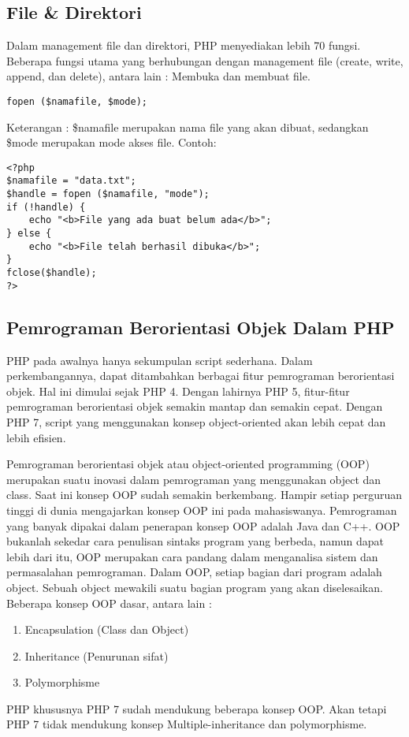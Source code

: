 \subsection{File & Direktori}
Dalam management file dan direktori, PHP menyediakan lebih 70 fungsi. Beberapa fungsi utama yang berhubungan dengan management file (create, write, append, dan delete), antara lain : Membuka dan membuat file.
\begin{lstlisting}
fopen ($namafile, $mode);
\end{lstlisting}
Keterangan :
\$namafile merupakan nama file yang akan dibuat, sedangkan \$mode merupakan mode akses file. Contoh:
\begin{lstlisting}
<?php
$namafile = "data.txt";
$handle = fopen ($namafile, "mode");
if (!handle) {
	echo "<b>File yang ada buat belum ada</b>";
} else {
	echo "<b>File telah berhasil dibuka</b>";
}
fclose($handle);
?>
\end{lstlisting}

\subsection{Pemrograman Berorientasi Objek Dalam PHP }
PHP pada awalnya hanya sekumpulan script sederhana. Dalam perkembangannya, dapat ditambahkan berbagai fitur pemrograman berorientasi objek. Hal ini dimulai sejak PHP 4. Dengan lahirnya PHP 5, fitur-fitur pemrograman berorientasi objek semakin mantap dan semakin cepat. Dengan PHP 7, script yang menggunakan konsep object-oriented akan lebih cepat dan lebih efisien.
\par
Pemrograman berorientasi objek atau object-oriented programming (OOP) merupakan suatu inovasi dalam pemrograman yang menggunakan object dan class. Saat ini konsep OOP sudah semakin berkembang. Hampir setiap perguruan tinggi di dunia mengajarkan konsep OOP ini pada mahasiswanya. Pemrograman yang banyak dipakai dalam penerapan konsep OOP adalah Java dan C++. OOP bukanlah sekedar cara penulisan sintaks program yang berbeda, namun dapat lebih dari itu, OOP merupakan cara pandang dalam menganalisa sistem dan permasalahan pemrograman. Dalam OOP, setiap bagian dari program adalah object. Sebuah object mewakili suatu bagian program yang akan diselesaikan. Beberapa konsep OOP dasar, antara lain :
\begin{enumerate}
\item Encapsulation (Class dan Object)
\item Inheritance (Penurunan sifat)
\item Polymorphisme
\end{enumerate}
\par
PHP khususnya PHP 7 sudah mendukung beberapa konsep OOP. Akan tetapi PHP 7 tidak mendukung konsep Multiple-inheritance dan polymorphisme.

